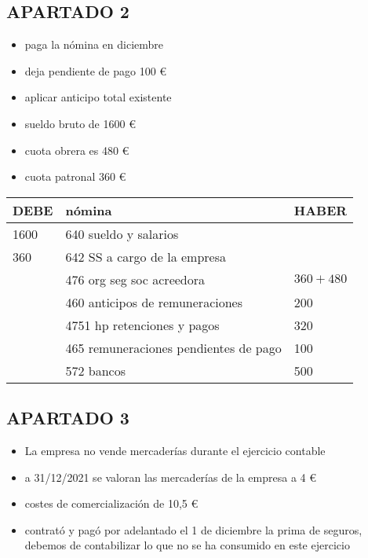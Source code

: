 \documentclass[a4paper,12pt]{article}
\begin{document}
\subsection*{APARTADO 2}

\begin{itemize}
    \item paga la nómina en diciembre
    \item deja pendiente de pago 100 \euro 
    \item aplicar anticipo total existente
    \item sueldo bruto de 1600 \euro
    \item cuota obrera es 480 \euro
    \item cuota patronal 360 \euro
\end{itemize}

\begin{table}[H]
    \centering
    \begin{tabular}{|p{3cm}|p{6cm}|p{3cm}|}
    \hline
    \textbf{DEBE} & \textbf{nómina} & \textbf{HABER} \\
    \hline
    1600 & 640 sueldo y salarios& \\
    \hline
    360 & 642 SS a cargo de la empresa& \\
    \hline
    & 476 org seg soc acreedora & $360 + 480$ \\
    \hline
    & 460 anticipos de remuneraciones& 200\\
    \hline
    &4751 hp retenciones y pagos & 320\\
    \hline
    & 465 remuneraciones pendientes de pago & 100\\
    \hline
    & 572 bancos & 500\\
    \hline
    \end{tabular}
    \end{table}

    \subsection*{APARTADO 3}
    \begin{itemize}
        \item La empresa no vende mercaderías durante el ejercicio contable
        \item a 31/12/2021 se valoran las mercaderías de la empresa a 4 \euro
        \item costes de comercialización de 10,5 \euro
        \item contrató y pagó por adelantado el 1 de diciembre la prima de seguros, debemos de contabilizar lo que no se ha consumido en este ejercicio
    \end{itemize}
\end{document}
